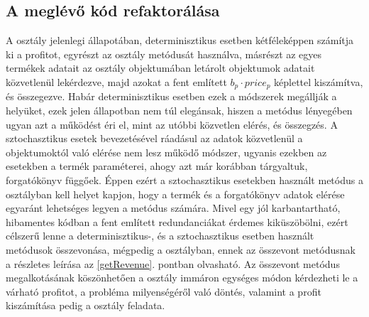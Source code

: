 \subsection{A meglévő kód refaktorálása}
A  osztály jelenlegi állapotában, determinisztikus esetben kétféleképpen számítja ki a profitot, egyrészt az  osztály  metódusát használva, másrészt az egyes termékek adatait az  osztály  objektumában letárolt  objektumok adatait közvetlenül lekérdezve, majd azokat a fent említett $b_p\cdot price_p$ képlettel kiszámítva, és összegezve.
Habár determinisztikus esetben ezek a módszerek megállják a helyüket, ezek jelen állapotban nem túl elegánsak, hiszen a  metódus lényegében ugyan azt a működést éri el, mint az utóbbi közvetlen elérés, és összegzés.
A sztochasztikus esetek bevezetésével ráadásul az adatok közvetlenül a  objektumoktól való elérése nem lesz működő módszer, ugyanis ezekben az esetekben a termék paraméterei, ahogy azt már korábban tárgyaltuk, forgatókönyv függőek.
Éppen ezért a sztochasztikus esetekben használt  metódus a  osztályban kell helyet kapjon, hogy a termék és a forgatókönyv adatok elérése egyaránt lehetséges legyen a metódus számára.
Mivel egy jól karbantartható, hibamentes kódban a fent említett redundanciákat érdemes kiküszöbölni, ezért célszerű lenne a determinisztikus-, és a sztochasztikus esetben használt  metódusok összevonása, mégpedig a  osztályban, ennek az összevont metódusnak a részletes leírása az \ref{getRevenue}. pontban olvasható.
Az összevont  metódus megalkotásának köszönhetően a  osztály immáron egységes módon kérdezheti le a várható profitot, a probléma milyenségéről való döntés, valamint a profit kiszámítása pedig a  osztály feladata.
